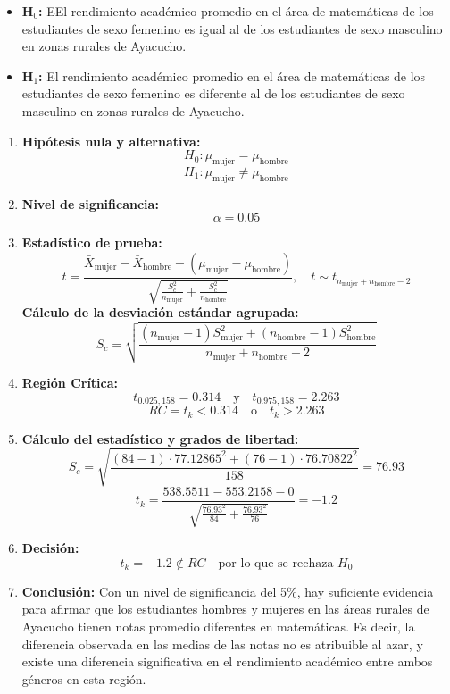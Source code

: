 \documentclass[
]{article}
\begin{document}
\begin{itemize}
    \item \textbf{H$_{0}$:} EEl rendimiento académico promedio en el área de matemáticas de los estudiantes de sexo femenino es igual al de los estudiantes de sexo masculino en zonas rurales de Ayacucho.

  \item \textbf{H$_{1}$:} El rendimiento académico promedio en el área de matemáticas de los estudiantes de sexo femenino es diferente al de los estudiantes de sexo masculino en zonas rurales de Ayacucho.

\end{itemize}

\begin{enumerate}
  \item \textbf{Hipótesis nula y alternativa:}
    \[
    H_0: \mu_{\text{mujer}} = \mu_{\text{hombre}}
    \]
    \[
    H_1: \mu_{\text{mujer}} \neq \mu_{\text{hombre}}
    \]

  \item \textbf{Nivel de significancia:}
    \[
    \alpha = 0.05
    \]

  \item \textbf{Estadístico de prueba:}
    \[
    t = \frac{\bar{X}_{\text{mujer}} - \bar{X}_{\text{hombre}} - (\mu_{\text{mujer}} - \mu_{\text{hombre}})}{\sqrt{\frac{S_c^2}{n_{\text{mujer}}} + \frac{S_c^2}{n_{\text{hombre}}}}}, \quad t \sim t_{n_{\text{mujer}} + n_{\text{hombre}} - 2}
    \]
    \textbf{Cálculo de la desviación estándar agrupada:}
    \[
    S_c = \sqrt{\frac{(n_{\text{mujer}} - 1) S_{\text{mujer}}^2 + (n_{\text{hombre}} - 1) S_{\text{hombre}}^2}{n_{\text{mujer}} + n_{\text{hombre}} - 2}}
    \]

  \item \textbf{Región Crítica:}
    \[
    t_{0.025, 158} = 0.314 \quad \text{y} \quad t_{0.975, 158} = 2.263
    \]
    \[
    RC = t_k < 0.314 \quad \text{o} \quad t_k > 2.263
    \]
    \item \textbf{Cálculo del estadístico y grados de libertad:}
    \[
    S_c = \sqrt{\frac{(84 - 1) \cdot 77.12865^2 + (76 - 1) \cdot 76.70822^2}{158}} = 76.93
    \]
    \[
    t_k = \frac{538.5511 - 553.2158 - 0}{\sqrt{\frac{76.93^2}{84} + \frac{76.93^2}{76}}} = -1.2
    \]
    \item \textbf{Decisión:}
    \[
    t_k = -1.2 \notin RC \quad \text{por lo que se rechaza } H_0
    \]

  \item \textbf{Conclusión:}
    Con un nivel de significancia del 5\%, hay suficiente evidencia para afirmar que los estudiantes hombres y mujeres en las áreas rurales de Ayacucho tienen notas promedio diferentes en matemáticas. Es decir, la diferencia observada en las medias de las notas no es atribuible al azar, y existe una diferencia significativa en el rendimiento académico entre ambos géneros en esta región.
    
\end{enumerate}
\end{document}
